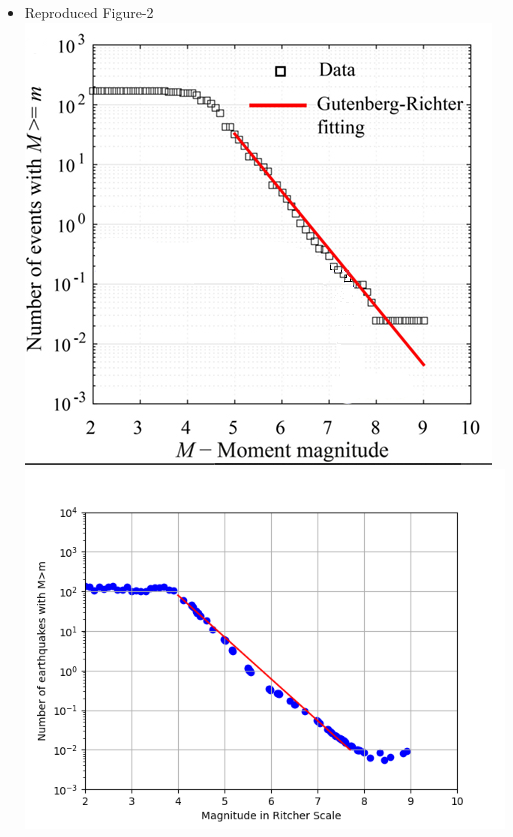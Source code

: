 \documentclass{article}
\begin{document}
\begin{itemize}
\newpage
\item Reproduced Figure-2\\
\includegraphics[scale =0.6]{gr fitting.PNG} \includegraphics[scale=0.6]{repgr.png}

\end{itemize}
\end{document}
